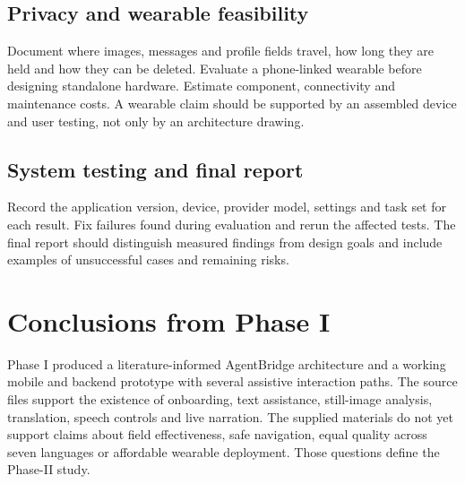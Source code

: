 \documentclass[12pt,a4paper,oneside]{report}
\begin{document}
\subsection{Privacy and wearable feasibility}
Document where images, messages and profile fields travel, how long they are held and how they can be deleted. Evaluate a phone-linked wearable before designing standalone hardware. Estimate component, connectivity and maintenance costs. A wearable claim should be supported by an assembled device and user testing, not only by an architecture drawing.

\subsection{System testing and final report}
Record the application version, device, provider model, settings and task set for each result. Fix failures found during evaluation and rerun the affected tests. The final report should distinguish measured findings from design goals and include examples of unsuccessful cases and remaining risks.

\section{Conclusions from Phase I}
Phase I produced a literature-informed AgentBridge architecture and a working mobile and backend prototype with several assistive interaction paths. The source files support the existence of onboarding, text assistance, still-image analysis, translation, speech controls and live narration. The supplied materials do not yet support claims about field effectiveness, safe navigation, equal quality across seven languages or affordable wearable deployment. Those questions define the Phase-II study.
\end{document}
